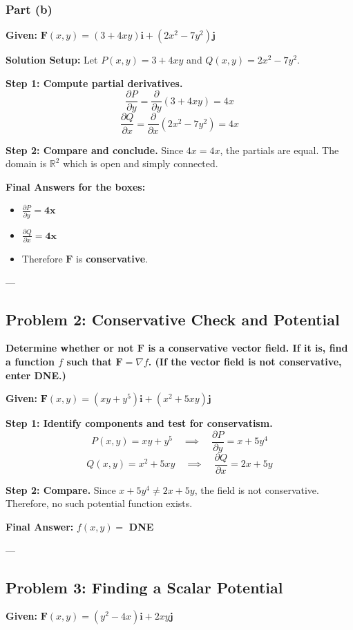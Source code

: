\documentclass[12pt]{article}
\begin{document}
\subsubsection*{Part (b)}
\textbf{Given:} $\mathbf{F}(x, y) = (3 + 4xy)\mathbf{i} + (2x^2 - 7y^2)\mathbf{j}$

\textbf{Solution Setup:}
Let $P(x, y) = 3 + 4xy$ and $Q(x, y) = 2x^2 - 7y^2$.

\textbf{Step 1: Compute partial derivatives.}
\[
\frac{\partial P}{\partial y} = \frac{\partial}{\partial y}(3 + 4xy) = 4x
\]
\[
\frac{\partial Q}{\partial x} = \frac{\partial}{\partial x}(2x^2 - 7y^2) = 4x
\]

\textbf{Step 2: Compare and conclude.}
Since $4x = 4x$, the partials are equal. The domain is $\mathbb{R}^2$ which is open and simply connected.

\textbf{Final Answers for the boxes:}
\begin{itemize}
    \item $\frac{\partial P}{\partial y} = \mathbf{4x}$
    \item $\frac{\partial Q}{\partial x} = \mathbf{4x}$
    \item Therefore $\mathbf{F}$ is \textbf{conservative}.
\end{itemize}

---

\subsection{Problem 2: Conservative Check and Potential}
\textbf{Determine whether or not $\mathbf{F}$ is a conservative vector field. If it is, find a function $f$ such that $\mathbf{F} = \nabla f$. (If the vector field is not conservative, enter DNE.)}

\textbf{Given:} $\mathbf{F}(x, y) = (xy + y^5)\mathbf{i} + (x^2 + 5xy)\mathbf{j}$

\textbf{Step 1: Identify components and test for conservatism.}
\[
P(x, y) = xy + y^5 \quad \implies \quad \frac{\partial P}{\partial y} = x + 5y^4
\]
\[
Q(x, y) = x^2 + 5xy \quad \implies \quad \frac{\partial Q}{\partial x} = 2x + 5y
\]

\textbf{Step 2: Compare.}
Since $x + 5y^4 \neq 2x + 5y$, the field is not conservative. Therefore, no such potential function exists.

\textbf{Final Answer:} $f(x,y) = $ \textbf{DNE}

---

\subsection{Problem 3: Finding a Scalar Potential}
\textbf{Given:} $\mathbf{F}(x, y) = (y^2 - 4x)\mathbf{i} + 2xy\mathbf{j}$
\end{document}
